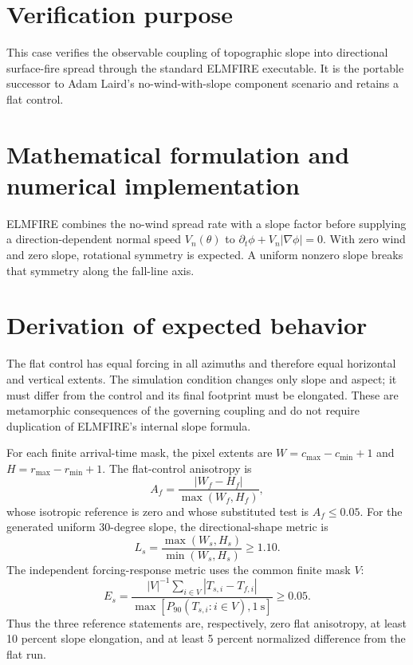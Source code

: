 \section{Verification purpose}

This case verifies the observable coupling of topographic slope into directional surface-fire spread through the standard ELMFIRE executable. It is the portable successor to Adam Laird's no-wind-with-slope component scenario and retains a flat control.

\section{Mathematical formulation and numerical implementation}

ELMFIRE combines the no-wind spread rate with a slope factor before supplying a direction-dependent normal speed $V_n(\theta)$ to $\partial_t\phi+V_n|\nabla\phi|=0$. With zero wind and zero slope, rotational symmetry is expected. A uniform nonzero slope breaks that symmetry along the fall-line axis.

\section{Derivation of expected behavior}

The flat control has equal forcing in all azimuths and therefore equal horizontal and vertical extents. The \SlopeAngle{} simulation condition changes only slope and aspect; it must differ from the control and its final footprint must be elongated. These are metamorphic consequences of the governing coupling and do not require duplication of ELMFIRE's internal slope formula.

For each finite arrival-time mask, the pixel extents are
\(W=c_{\max}-c_{\min}+1\) and \(H=r_{\max}-r_{\min}+1\).
The flat-control anisotropy is
\[
 A_f=\frac{|W_f-H_f|}{\max(W_f,H_f)},
\]
whose isotropic reference is zero and whose substituted test is
\(A_f\leq0.05\).  For the generated uniform 30-degree slope, the
directional-shape metric is
\[
 L_s=\frac{\max(W_s,H_s)}{\min(W_s,H_s)}\geq1.10.
\]
The independent forcing-response metric uses the common finite mask
\(V\):
\[
 E_s=\frac{|V|^{-1}\sum_{i\in V}|T_{s,i}-T_{f,i}|}
 {\max[P_{90}(T_{s,i}:i\in V),1~\mathrm{s}]}\geq0.05.
\]
Thus the three reference statements are, respectively, zero flat
anisotropy, at least 10 percent slope elongation, and at least 5 percent
normalized difference from the flat run.

